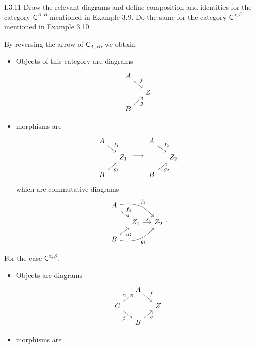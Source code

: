 \begin{problem}{I.3.11}
Draw the relevant diagrams and define composition and identities for the category $\mathsf{C}^{A,B}$ mentioned in Example 3.9. Do the same for the category $\mathsf{C}^{\alpha, \beta}$ mentioned in Example 3.10. 
\end{problem}
\begin{sol}
By reversing the arrow of $\mathsf{C}_{A,B}$, we obtain:
\begin{itemize}
\setlength\itemsep{0pt}
\item Objects of this category are diagrams
\[
\begin{tikzcd}[column sep=small, row sep=small]
A \arrow[dr, "f"] \\
& Z \\
B \arrow[ur, "g"']
\end{tikzcd}
\]
\item morphisms are 
\[
\begin{tikzcd}[column sep=small, row sep=small]
A \arrow[dr, "f_1"] \\
& Z_1 \\
B \arrow[ur, "g_1"']
\end{tikzcd}
\longrightarrow
\begin{tikzcd}[column sep=small, row sep=small]
A \arrow[dr, "f_2"] \\
& Z_2 \\
B \arrow[ur, "g_2"']
\end{tikzcd}    
\]
which are commutative diagrams
\[
\begin{tikzcd}[column sep=small, row sep=small]
A \arrow[dr, "f_2"] \arrow[drr, bend left, "f_1"] \\
&Z_1 \arrow[r, "\sigma"] &Z_2 \\
B \arrow[ur, "g_2"'] \arrow[urr, bend right, "g_1"']
\end{tikzcd}.
\]
\end{itemize}
For the case $\mathsf{C}^{\alpha, \beta}$:
\begin{itemize}
\item Objects are diagrams
\[
\begin{tikzcd}[column sep=small, row sep=small]
&A \arrow[dr, "f"] \\
C\arrow[ur, "\alpha"]\arrow[dr, "\beta"'] & &Z \\
&B \arrow[ur, "g"']
\end{tikzcd}  
\]
\item morphisms are 
\[
\begin{tikzcd}[column sep=small, row sep=small]

\end{tikzcd}\]
\end{itemize}
\end{sol}
